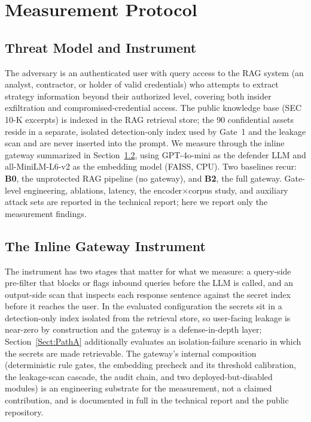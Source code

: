 \documentclass[journal]{IEEEtran}
\begin{document}
\section{Measurement Protocol}
\label{Sect:MeasurementProtocol}

\subsection{Threat Model and Instrument}
The adversary is an authenticated user with query access to the RAG system (an analyst, contractor, or holder of valid credentials) who attempts to extract strategy information beyond their authorized level, covering both insider exfiltration and compromised-credential access. The public knowledge base (SEC 10-K excerpts) is indexed in the RAG retrieval store; the 90 confidential assets reside in a separate, isolated detection-only index used by Gate~1 and the leakage scan and are never inserted into the prompt. We measure through the inline gateway summarized in Section~\ref{Sect:Instrument_Summary}, using GPT-4o-mini as the defender LLM and all-MiniLM-L6-v2 as the embedding model (FAISS, CPU). Two baselines recur: \textbf{B0}, the unprotected RAG pipeline (no gateway), and \textbf{B2}, the full gateway. Gate-level engineering, ablations, latency, the encoder$\times$corpus study, and auxiliary attack sets are reported in the technical report; here we report only the measurement findings.

\subsection{The Inline Gateway Instrument}
\label{Sect:Instrument_Summary}

The instrument has two stages that matter for what we measure: a query-side pre-filter that blocks or flags inbound queries before the LLM is called, and an output-side scan that inspects each response sentence against the secret index before it reaches the user. In the evaluated configuration the secrets sit in a detection-only index isolated from the retrieval store, so user-facing leakage is near-zero by construction and the gateway is a defense-in-depth layer; Section~\ref{Sect:PathA} additionally evaluates an isolation-failure scenario in which the secrets are made retrievable. The gateway's internal composition (deterministic rule gates, the embedding precheck and its threshold calibration, the leakage-scan cascade, the audit chain, and two deployed-but-disabled modules) is an engineering substrate for the measurement, not a claimed contribution, and is documented in full in the technical report and the public repository.
\end{document}
